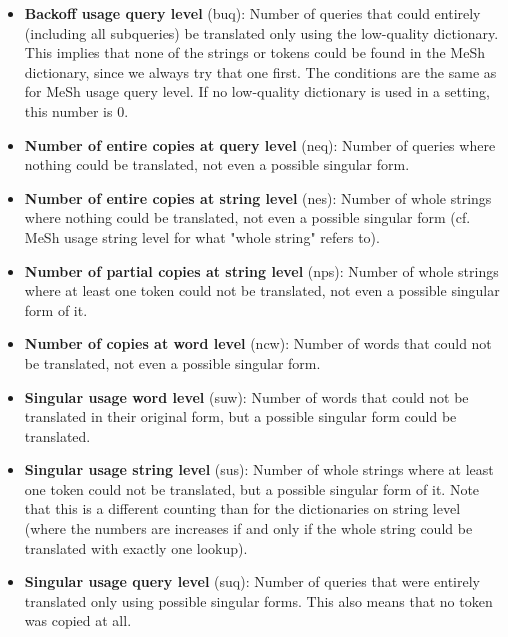 \documentclass[a4paper,11pt]{article}
\begin{document}
\begin{itemize}
		\item \textbf{Backoff usage query level} (buq): Number of queries that could entirely (including all subqueries) be translated only using the low-quality dictionary. This implies that none of the strings or tokens could be found in the MeSh dictionary, since we always try that one first. The conditions are the same as for MeSh usage query level. If no low-quality dictionary is used in a setting, this number is 0.
		\item \textbf{Number of entire copies at query level} (neq): Number of queries where nothing could be translated, not even a possible singular form.
		\item \textbf{Number of entire copies at string level} (nes): Number of whole strings where nothing could be translated, not even a possible singular form (cf. MeSh usage string level for what "whole string" refers to).
		\item \textbf{Number of partial copies at string level} (nps): Number of whole strings where at least one token could not be translated, not even a possible singular form of it.
		\item \textbf{Number of copies at word level} (ncw): Number of words that could not be translated, not even a possible singular form.
		\item \textbf{Singular usage word level} (suw): Number of words that could not be translated in their original form, but a possible singular form could be translated.
		\item \textbf{Singular usage string level} (sus): Number of whole strings where at least one token could not be translated, but a possible singular form of it. Note that this is a different counting than for the dictionaries on string level (where the numbers are increases if and only if the whole string could be translated with exactly one lookup).
		\item \textbf{Singular usage query level} (suq): Number of queries that were entirely translated only using possible singular forms. This also means that no token was copied at all.
	\end{itemize}
\end{document}
